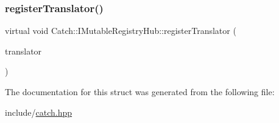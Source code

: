 \mbox{\label{struct_catch_1_1_i_mutable_registry_hub_ae6825365102693cf7707db022a2c2b49}} 
\subsubsection{\texorpdfstring{registerTranslator()}{registerTranslator()}}
{\footnotesize\ttfamily virtual void Catch\+::\+I\+Mutable\+Registry\+Hub\+::register\+Translator (\begin{DoxyParamCaption}\item[{const \mbox{\hyperlink{struct_catch_1_1_i_exception_translator}{I\+Exception\+Translator}} $\ast$}]{translator }\end{DoxyParamCaption})\hspace{0.3cm}{\ttfamily [pure virtual]}}



The documentation for this struct was generated from the following file\+:\begin{DoxyCompactItemize}
\item 
include/\mbox{\hyperlink{catch_8hpp}{catch.\+hpp}}\end{DoxyCompactItemize}
